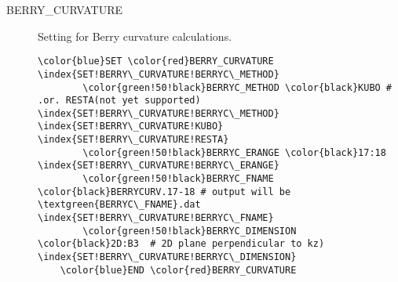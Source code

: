 \documentclass[a4paper,12pt]{scrartcl}
\makeatletter
\def\namedlabel#1#2{\begingroup
    #2%
    \def\@currentlabel{#2}%
    \phantomsection\label{#1}\endgroup
}
\newcommand{\textgreen}[1]{\textcolor{green!50!black}{\texttt{#1}}}
\makeatother
\begin{document}
\begin{description}
    \item[\namedlabel{tag:BERRYC}{BERRY\_CURVATURE}] 
		Setting for Berry curvature calculations.
 \begin{Verbatim}[commandchars=\\\{\},gobble=4, frame=single, framesep=2mm, 
	label= Berrycurvature setup,
	labelposition=bottomline]
    \color{blue}SET \color{red}BERRY_CURVATURE  \index{SET!BERRY\_CURVATURE!BERRYC\_METHOD}
        \color{green!50!black}BERRYC_METHOD \color{black}KUBO # .or. RESTA(not yet supported)  \index{SET!BERRY\_CURVATURE!BERRYC\_METHOD}  \index{SET!BERRY\_CURVATURE!KUBO} \index{SET!BERRY\_CURVATURE!RESTA}
        \color{green!50!black}BERRYC_ERANGE \color{black}17:18  \index{SET!BERRY\_CURVATURE!BERRYC\_ERANGE}
        \color{green!50!black}BERRYC_FNAME  \color{black}BERRYCURV.17-18 # output will be \textgreen{BERRYC\_FNAME}.dat  \index{SET!BERRY\_CURVATURE!BERRYC\_FNAME}
        \color{green!50!black}BERRYC_DIMENSION \color{black}2D:B3  # 2D plane perpendicular to kz)  \index{SET!BERRY\_CURVATURE!BERRYC\_DIMENSION}
    \color{blue}END \color{red}BERRY_CURVATURE
 \end{Verbatim}


\end{description}
\end{document}
